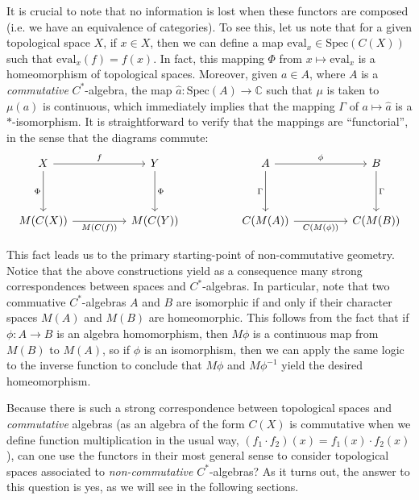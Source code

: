 \documentclass[aps,pra,showpacs,notitlepage,onecolumn,superscriptaddress,nofootinbib]{revtex4-1}
\theoremstyle{definition}
\begin{document}
It is crucial to note that no information is lost when these functors are composed (i.e. we have an equivalence of categories). To see this, let us note that for a given topological space $X$,
if $x \in X$, then we can define a map $\text{eval}_x \in \text{Spec}(C(X))$ such that $\text{eval}_x(f) = f(x)$. In fact, this mapping $\Phi$ from $x \mapsto \text{eval}_x$ is a homeomorphism of topological spaces.
Moreover, given $a \in A$, where $A$ is a \emph{commutative} $C^{*}$-algebra,
the map $\widehat{a} : \text{Spec}(A) \rightarrow \mathbb{C}$ such that $\mu$ is taken to $\mu(a)$ is continuous, which immediately implies that the mapping $\Gamma$ of $a \mapsto \widehat{a}$ is a $*$-isomorphism.
It is straightforward to verify that the mappings are ``functorial'', in the sense that the diagrams commute:
\[\begin{tikzcd}
X && Y && A && B \\
\\
	{M(C(X))} && {M(C(Y))} && {C(M(A))} && {C(M(B))}
	\arrow["f", from=1-1, to=1-3]
	\arrow["\Phi", from=1-3, to=3-3]
	\arrow["\Phi"', from=1-1, to=3-1]
	\arrow["{M(C(f))}"', from=3-1, to=3-3]
	\arrow["\phi", from=1-5, to=1-7]
	\arrow["\Gamma"', from=1-5, to=3-5]
	\arrow["{C(M(\phi))}"', from=3-5, to=3-7]
	\arrow["\Gamma", from=1-7, to=3-7]
\end{tikzcd}\]

\noindent This fact leads us to the primary starting-point of non-commutative geometry. Notice that the above constructions yield as a consequence many strong correspondences between spaces and $C^{*}$-algebras.
In particular, note that two commuative $C^{*}$-algebras $A$ and $B$ are isomorphic if and only if their character spaces $M(A)$ and $M(B)$ are homeomorphic. This
follows from the fact that if $\phi : A \rightarrow B$ is an algebra homomorphism, then $M\phi$ is a continuous map from $M(B)$ to $M(A)$, so if $\phi$ is an isomorphism, then
we can apply the same logic to the inverse function to conclude that $M\phi$ and $M\phi^{-1}$ yield the desired homeomorphism.

Because there is such a strong correspondence between topological spaces and \emph{commutative}
algebras (as an algebra of the form $C(X)$ is commutative when we define function multiplication in the usual way, $(f_1 \cdot f_2)(x) = f_1(x) \cdot f_2(x)$), can one
use the functors in their most general sense to consider topological spaces associated to \emph{non-commutative} $C^{*}$-algebras? As it turns out, the answer to this question
is yes, as we will see in the following sections.
\end{document}
